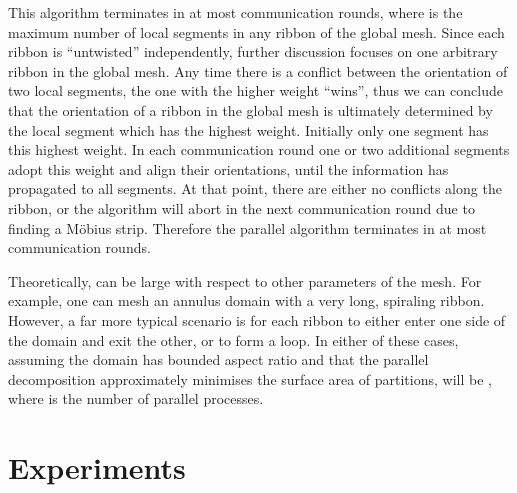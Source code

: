 \documentclass[oneeqnum,onethmnum,onefignum,onetabnum]{siamltex1213}
\begin{document}
This algorithm terminates in at most  communication rounds, where
 is the maximum number of local segments in any ribbon of the
global mesh. Since each ribbon is ``untwisted'' independently, further
discussion focuses on one arbitrary ribbon in the global mesh.
Any time there is a conflict between the orientation of two local
segments, the one with the higher weight ``wins'', thus we can
conclude that the orientation of a ribbon in the global mesh is
ultimately determined by the local segment which has the highest
weight. Initially only one segment has this highest weight. In each
communication round one or two additional segments adopt this weight
and align their orientations, until the information has propagated
to all segments. At that point, there are either no conflicts along
the ribbon, or the algorithm will abort in the next communication
round due to finding a Möbius strip. Therefore the parallel
algorithm terminates in at most  communication rounds.

Theoretically,  can be large with respect to other parameters of the
mesh. For example, one can mesh an annulus domain with a very long,
spiraling ribbon. However, a far more typical scenario is for each ribbon to
either enter one side of the domain and exit the other, or to form a
loop. In either of these cases, assuming the domain has bounded aspect ratio
and that the parallel decomposition approximately minimises the surface area
of partitions,  will be , where  is the number of
parallel processes.

\section{Experiments}
\label{sec:experiments}
\end{document}
